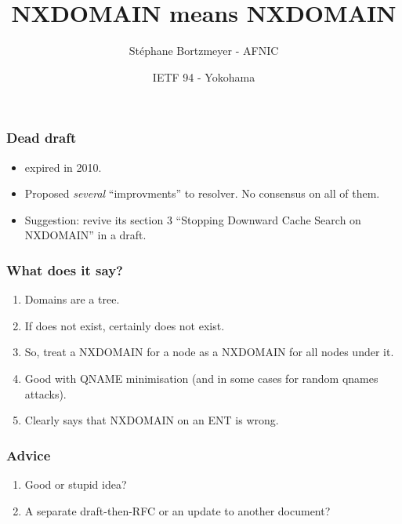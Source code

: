 \documentclass[ignorenonframetext]{beamer}
\title{NXDOMAIN means NXDOMAIN}
\author{Stéphane Bortzmeyer - AFNIC}
\date{IETF 94 - Yokohama}
\begin{document}
\begin{frame}
\maketitle  
\end{frame}

\begin{frame}
  \frametitle{Dead draft}
  \begin{itemize}
  \item<2-> expired in 2010.
  \item<3->Proposed \emph{several} ``improvments'' to resolver. No
    consensus on all of them.
  \item<4->Suggestion: revive its section 3 ``Stopping Downward Cache
    Search on NXDOMAIN'' in a draft.
  \end{itemize}
\end{frame}

\begin{frame}
  \frametitle{What does it say?}
  \begin{enumerate}
  \item<2->Domains are a tree.
  \item<3->If  does not exist, certainly
     does not exist.
  \item<4->So, treat a NXDOMAIN for a node as a NXDOMAIN for all nodes
    under it.
   \item<5->Good with QNAME minimisation (and in some cases for random
     qnames attacks).
    \item<6->Clearly says that NXDOMAIN on an ENT is wrong.
  \end{enumerate}
\end{frame}

\begin{frame}
  \frametitle{Advice}
  \begin{enumerate}
  \item<2->Good or stupid idea?
  \item<3->A separate draft-then-RFC or an update to another document?  
  \end{enumerate}
\end{frame}
\end{document}
